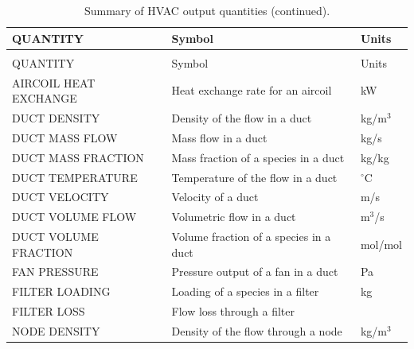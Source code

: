 \documentclass[11pt]{book}
\begin{document}
\begin{longtable}{|l|l|l|@{\extracolsep{\fill}}}
\caption[HVAC output quantities]{Summary of HVAC output quantities.}
\label{tab:hvacoutput} \\
\hline
{\ct QUANTITY}                                  & Symbol                                    & Units           \\
\hline \hline
\endfirsthead
\caption[]{Summary of HVAC output quantities (continued).} \\
\hline
{\ct QUANTITY}                                  & Symbol                                    & Units           \\
\hline \hline
\endhead
{\ct AIRCOIL HEAT EXCHANGE}                     & Heat exchange rate for an aircoil         &  kW                   \\ \hline
{\ct DUCT DENSITY}                              & Density of the flow in a duct             &  kg/m$^3$             \\ \hline
{\ct DUCT MASS FLOW}                            & Mass flow in a duct                       &  kg/s                 \\ \hline
{\ct DUCT MASS FRACTION}                        & Mass fraction of a species in a duct      &  kg/kg                \\ \hline
{\ct DUCT TEMPERATURE}                          & Temperature of the flow in a duct         & $^\circ$C             \\ \hline
{\ct DUCT VELOCITY}                             & Velocity of a duct                        &  m/s                  \\ \hline
{\ct DUCT VOLUME FLOW}                          & Volumetric flow in a duct                 &  m$^3$/s              \\ \hline
{\ct DUCT VOLUME FRACTION}                      & Volume fraction of a species in a duct    &  mol/mol              \\ \hline
{\ct FAN PRESSURE}                              & Pressure output of a fan in a duct        &  Pa                   \\ \hline
{\ct FILTER LOADING}                            & Loading of a species in a filter          &  kg                   \\ \hline
{\ct FILTER LOSS}                               & Flow loss through a filter                &                       \\ \hline
{\ct NODE DENSITY}                              & Density of the flow through a node        &  kg/m$^3$             \\ \hline

\end{longtable}
\end{document}
